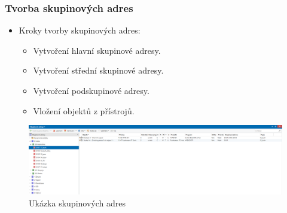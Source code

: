 \documentclass[%
  12pt,       				%
	t,                  %
	aspectratio=1610,   %
	unicode,						%
]{beamer}				    	%
\begin{document}
\begin{frame} 
	\frametitle{Tvorba skupinových adres}
	\begin{itemize}
	    \item Kroky tvorby skupinových adres:	
	        \begin{itemize}
	            \item Vytvoření hlavní skupinové adresy.
	            \item Vytvoření střední skupinové adresy.
	            \item Vytvoření podskupinové adresy.
	            \item Vložení objektů z přístrojů.
	        \end{itemize}
	\end{itemize}

			\begin{figure}%
				\centering
				\vspace{0.2cm}	              %
				\includegraphics[width=1\columnwidth]{obrazky/Ukazka skupinovych adres.png}
				\caption{Ukázka skupinových adres}
			\end{figure}
\end{frame}
\end{document}
